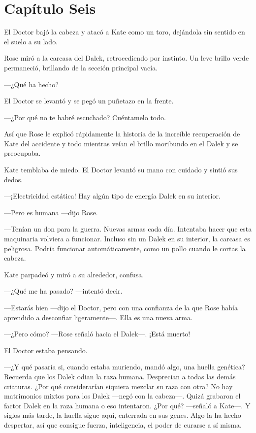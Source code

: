 \chapter*{Capítulo Seis}

El Doctor bajó la cabeza y atacó a Kate como un toro, dejándola sin
sentido en el suelo a su lado.

Rose miró a la carcasa del Dalek, retrocediendo por instinto. Un leve
brillo verde permaneció, brillando de la sección principal vacía.

---¿Qué ha hecho?

El Doctor se levantó y se pegó un puñetazo en la frente.

---¿Por qué no te habré escuchado? Cuéntamelo todo.

Así que Rose le explicó rápidamente la historia de la increíble
recuperación de Kate del accidente y todo mientras veían el brillo
moribundo en el Dalek y se preocupaba.

Kate temblaba de miedo. El Doctor levantó su mano con cuidado y sintió
sus dedos.

---¡Electricidad estática! Hay algún tipo de energía Dalek en su
interior.

---Pero es humana ---dijo Rose.

---Tenían un don para la guerra. Nuevas armas cada día. Intentaba hacer
que esta maquinaria volviera a funcionar. Incluso sin un Dalek en su
interior, la carcasa es peligrosa. Podría funcionar automáticamente,
como un pollo cuando le cortas la cabeza.

Kate parpadeó y miró a su alrededor, confusa.

---¿Qué me ha pasado? ---intentó decir.

---Estarás bien ---dijo el Doctor, pero con una confianza de la que Rose
había aprendido a desconfiar ligeramente---. Ella es una nueva arma.

---¿Pero cómo? ---Rose señaló hacia el Dalek---. ¡Está muerto!

El Doctor estaba pensando.

---¿Y qué pasaría si, cuando estaba muriendo, mandó algo, una huella
genética? Recuerda que los Dalek odian la raza humana. Desprecian a
todas las demás criaturas. ¿Por qué considerarían siquiera mezclar su
raza con otra? No hay matrimonios mixtos para los Dalek ---negó con la
cabeza---. Quizá grabaron el factor Dalek en la raza humana o eso
intentaron. ¿Por qué? ---señaló a Kate---. Y siglos más tarde, la huella
sigue aquí, enterrada en sus genes. Algo la ha hecho despertar, así que
consigue fuerza, inteligencia, el poder de curarse a sí misma.


